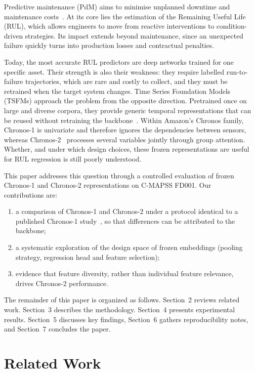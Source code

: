 \documentclass{svproc}
\begin{document}
Predictive maintenance (PdM) aims to minimise unplanned downtime and
maintenance costs~\cite{khan2018}. At its core lies the estimation of the
Remaining Useful Life (RUL), which allows engineers to move from reactive
interventions to condition-driven strategies. Its impact extends
beyond maintenance, since an unexpected failure quickly turns into
production losses and contractual penalties.

Today, the most accurate RUL predictors are deep networks trained for one
specific asset. Their strength is also their weakness: they require
labelled run-to-failure trajectories, which are rare and costly to
collect, and they must be retrained when the target system changes. Time
Series Foundation Models (TSFMs) approach the problem from the opposite
direction. Pretrained once on large and diverse corpora, they provide
generic temporal representations that can be reused without retraining
the backbone~\cite{chronos2024}. Within Amazon's Chronos family, Chronos-1 is univariate and therefore ignores the
dependencies between sensors, whereas Chronos-2~\cite{chronos2_2025}
processes several variables jointly through group attention. Whether, and
under which design choices, these frozen representations are useful for
RUL regression is still poorly understood.

This paper addresses this question through a controlled evaluation of
frozen Chronos-1 and Chronos-2 representations on C-MAPSS FD001. Our
contributions are:
\begin{enumerate}
\item a comparison of Chronos-1 and Chronos-2 under a protocol identical
  to a published Chronos-1 study~\cite{imsa2025}, so that differences can
  be attributed to the backbone;
\item a systematic exploration of the design space of frozen embeddings
  (pooling strategy, regression head and feature selection);
\item evidence that feature diversity, rather than individual feature
  relevance, drives Chronos-2 performance.
\end{enumerate}

The remainder of this paper is organized as follows. Section~2 reviews
related work. Section~3 describes the methodology. Section~4 presents
experimental results. Section~5 discusses key findings, Section~6 gathers
reproducibility notes, and Section~7 concludes the paper.

\section{Related Work}
\end{document}
